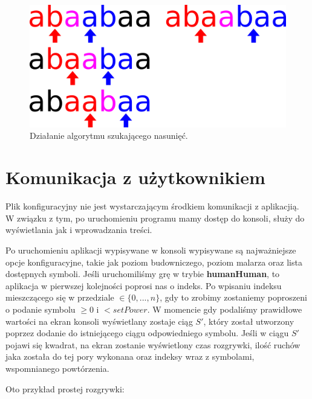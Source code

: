 \documentclass[document]{xmgr}
\begin{document}
\begin{figure}[H]
    \centering
    \includegraphics[scale = 0.2]{images/overlapFinding}
    \caption{Działanie algorytmu szukającego nasunięć.}
    \label{fig:overlapFinding}
\end{figure}

\section{Komunikacja z użytkownikiem}
Plik konfiguracyjny nie jest wystarczającym środkiem komunikacji z aplikacjią. W związku z tym, po uruchomieniu programu mamy dostęp do konsoli, służy do wyświetlania jak i wprowadzania treści.

Po uruchomieniu aplikacji wypisywane w konsoli wypisywane są najważniejsze opcje konfiguracyjne, takie jak poziom budowniczego, poziom malarza oraz lista dostępnych symboli. Jeśli uruchomiliśmy grę w trybie \textbf{humanHuman}, to aplikacja w pierwszej kolejności poprosi nas o indeks. Po wpisaniu indeksu mieszczącego się w przedziale $\in \{0,...,n\}$, gdy to zrobimy zostaniemy poproszeni o podanie symbolu $\geq 0$ i $< setPower$. W momencie gdy podaliśmy prawidłowe wartości na ekran konsoli wyświetlany zostaje ciąg $S'$, który został utworzony poprzez dodanie do istniejącego ciągu odpowiedniego symbolu. Jeśli w ciągu $S'$ pojawi się kwadrat, na ekran zostanie wyświetlony czas rozgrywki, ilość ruchów jaka została do tej pory wykonana oraz indeksy wraz z symbolami, wspomnianego powtórzenia.

Oto przykład prostej rozgrywki:
\end{document}
